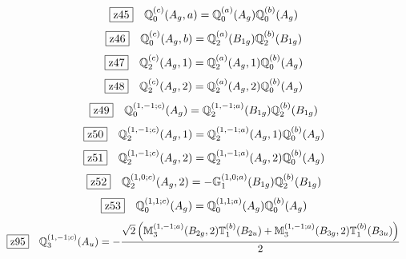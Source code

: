 \documentclass[fleqn,10pt,landscape]{jsarticle}
\begin{document}
\begin{dmath*}
\hspace*{3mm}\fbox{z45}\quad \mathbb{Q}_{0}^{(c)}(A_{g},a)=\mathbb{Q}_{0}^{(a)}(A_{g}) \mathbb{Q}_{0}^{(b)}(A_{g})
\end{dmath*}
\begin{dmath*}
\hspace*{3mm}\fbox{z46}\quad \mathbb{Q}_{0}^{(c)}(A_{g},b)=\mathbb{Q}_{2}^{(a)}(B_{1g}) \mathbb{Q}_{2}^{(b)}(B_{1g})
\end{dmath*}
\begin{dmath*}
\hspace*{3mm}\fbox{z47}\quad \mathbb{Q}_{2}^{(c)}(A_{g},1)=\mathbb{Q}_{2}^{(a)}(A_{g},1) \mathbb{Q}_{0}^{(b)}(A_{g})
\end{dmath*}
\begin{dmath*}
\hspace*{3mm}\fbox{z48}\quad \mathbb{Q}_{2}^{(c)}(A_{g},2)=\mathbb{Q}_{2}^{(a)}(A_{g},2) \mathbb{Q}_{0}^{(b)}(A_{g})
\end{dmath*}
\begin{dmath*}
\hspace*{3mm}\fbox{z49}\quad \mathbb{Q}_{0}^{(1,-1;c)}(A_{g})=\mathbb{Q}_{2}^{(1,-1;a)}(B_{1g}) \mathbb{Q}_{2}^{(b)}(B_{1g})
\end{dmath*}
\begin{dmath*}
\hspace*{3mm}\fbox{z50}\quad \mathbb{Q}_{2}^{(1,-1;c)}(A_{g},1)=\mathbb{Q}_{2}^{(1,-1;a)}(A_{g},1) \mathbb{Q}_{0}^{(b)}(A_{g})
\end{dmath*}
\begin{dmath*}
\hspace*{3mm}\fbox{z51}\quad \mathbb{Q}_{2}^{(1,-1;c)}(A_{g},2)=\mathbb{Q}_{2}^{(1,-1;a)}(A_{g},2) \mathbb{Q}_{0}^{(b)}(A_{g})
\end{dmath*}
\begin{dmath*}
\hspace*{3mm}\fbox{z52}\quad \mathbb{Q}_{2}^{(1,0;c)}(A_{g},2)=- \mathbb{G}_{1}^{(1,0;a)}(B_{1g}) \mathbb{Q}_{2}^{(b)}(B_{1g})
\end{dmath*}
\begin{dmath*}
\hspace*{3mm}\fbox{z53}\quad \mathbb{Q}_{0}^{(1,1;c)}(A_{g})=\mathbb{Q}_{0}^{(1,1;a)}(A_{g}) \mathbb{Q}_{0}^{(b)}(A_{g})
\end{dmath*}
\begin{dmath*}
\hspace*{3mm}\fbox{z95}\quad \mathbb{Q}_{3}^{(1,-1;c)}(A_{u})=- \frac{\sqrt{2} \left(\mathbb{M}_{3}^{(1,-1;a)}(B_{2g},2) \mathbb{T}_{1}^{(b)}(B_{2u}) + \mathbb{M}_{3}^{(1,-1;a)}(B_{3g},2) \mathbb{T}_{1}^{(b)}(B_{3u})\right)}{2}
\end{dmath*}
\end{document}
